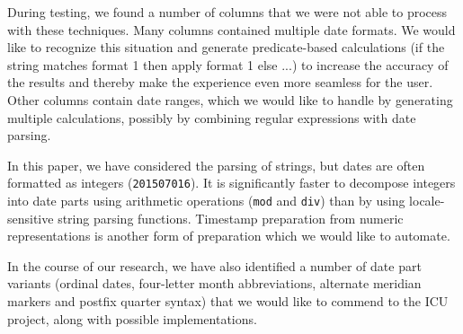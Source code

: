 During testing, we found a number of columns that we were not able to process with these techniques. Many columns contained multiple date formats. We would like to recognize this situation and generate predicate-based calculations (\eg if the string matches format 1 then apply format 1 else ...) to increase the accuracy of the results and thereby make the experience even more seamless for the user. Other columns contain date ranges, which we would like to handle by generating multiple calculations, possibly by combining regular expressions with date parsing.

In this paper, we have considered the parsing of strings, but dates are often formatted as integers (\eg \texttt{201507016}). It is significantly faster to decompose integers into date parts using arithmetic operations (\eg \texttt{mod} and \texttt{div}) than by using locale-sensitive string parsing functions. Timestamp preparation from numeric representations is another form of preparation which we would like to automate.

In the course of our research, we have also identified a number of date part variants (\eg ordinal dates, four-letter month abbreviations, alternate meridian markers and postfix quarter syntax) that we would like to commend to the ICU project, along with possible implementations.
